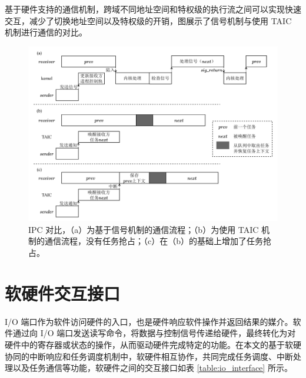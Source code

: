 基于硬件支持的通信机制，跨域不同地址空间和特权级的执行流之间可以实现快速交互，减少了切换地址空间以及特权级的开销，图展示了信号机制与使用 TAIC 机制进行通信的对比。

\begin{figure}
    \centering
    \includegraphics[width=\textwidth]{figures/pdfs/communicate_demo.pdf}
    \caption{IPC 对比，（a）为基于信号机制的通信流程；（b）为使用 TAIC 机制的通信流程，没有任务抢占；（c）在（b）的基础上增加了任务抢占。}
\end{figure}

\section{软硬件交互接口}

I/O 端口作为软件访问硬件的入口，也是硬件响应软件操作并返回结果的媒介。软件通过向 I/O 端口发送读写命令，将数据与控制信号传递给硬件，最终转化为对硬件中的寄存器或状态的操作，从而驱动硬件完成特定的功能。在本文的基于软硬协同的中断响应和任务调度机制中，软硬件相互协作，共同完成任务调度、中断处理以及任务通信等功能，软硬件之间的交互接口如表 \ref{table:io_interface} 所示。

